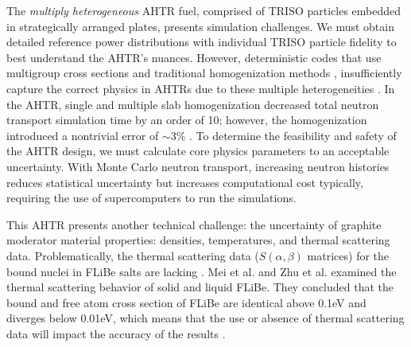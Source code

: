 The \emph{multiply heterogeneous} \gls{AHTR} fuel, comprised of \gls{TRISO} 
particles embedded in strategically arranged plates, presents simulation challenges. 
We must obtain detailed reference power distributions with individual 
\gls{TRISO} particle fidelity to best understand the \gls{AHTR}'s nuances.
However, deterministic codes that use multigroup cross sections and traditional 
homogenization methods \cite{ramey_monte_2018}, insufficiently capture the 
correct physics in \glspl{AHTR} due to these multiple heterogeneities
\cite{ramey_monte_2018}. 
In the \gls{AHTR}, single and multiple slab homogenization decreased total 
neutron transport simulation time by an order of 10; however, the homogenization 
introduced a nontrivial error of $\sim$3\% \cite{ramey_monte_2018,cisneros_neutronics_2012}.
To determine the feasibility and safety of the \gls{AHTR} design, we must 
calculate core physics parameters to an acceptable uncertainty. 
With Monte Carlo neutron transport, increasing neutron histories reduces statistical 
uncertainty but increases computational cost typically, requiring the use of 
supercomputers to run the simulations.

This \gls{AHTR} presents another technical challenge: the uncertainty of 
graphite moderator material properties: densities, temperatures, and thermal 
scattering data.
Problematically, the thermal scattering data ($S(\alpha,\beta)$ matrices) for 
the bound nuclei in \gls{FLiBe} salts are lacking \cite{ramey_monte_2018}. 
Mei et al. \cite{mei_investigation_2013} and Zhu et al. \cite{zhu_thermal_2017} 
examined the thermal scattering behavior of solid and liquid \gls{FLiBe}.
They concluded that the bound and free atom cross section of \gls{FLiBe} are 
identical above 0.1eV and diverges below 0.01eV, which means that the use or 
absence of thermal scattering data will impact the accuracy of the results 
\cite{ramey_monte_2018}. 

